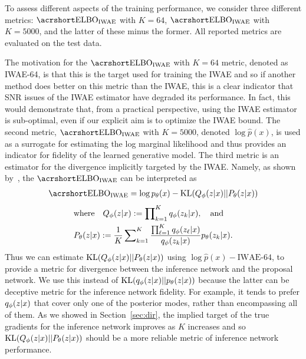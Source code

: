 To assess different aspects of the training performance, we consider three
different metrics: $\ELBO_{\text{IWAE}}$ with $K=64$, 
$\ELBO_{\text{IWAE}}$ with $K=5000$, and the latter of these minus
 the former.  All reported metrics are evaluated on the test data.

The motivation for the  $\ELBO_{\text{IWAE}}$ with $K=64$ metric,
denoted as \gls{IWAE}-64, is that this is the target
used for training the \gls{IWAE} and so if another method does better on
this metric than the \gls{IWAE}, this is a clear indicator that \gls{SNR} issues
of the \gls{IWAE} estimator have degraded its performance.   In fact, 
this would demonstrate that, from a practical perspective, 
using the \gls{IWAE} estimator is sub-optimal, even if our explicit aim is to
optimize the \gls{IWAE} bound.  
The second metric, $\ELBO_{\text{IWAE}}$ with $K=5000$, denoted $\log \hat{p}(x)$, is used as a surrogate
for estimating the log marginal likelihood and thus provides an indicator
for fidelity of the learned generative model.  
The third metric is an
estimator for the divergence implicitly targeted by the \gls{IWAE}.  Namely, as shown
by~\citet{le2017auto}, the $\ELBO_{\text{IWAE}}$ can be interpreted as
\begin{align}
\ELBO_{\text{IWAE}} = 
\log p_{\theta}(x) - \mathrm{KL}(Q_{\phi}(z \given x) || P_{\theta}(z \given x))
\end{align}
\begin{align}
&\text{where} \quad Q_{\phi}(z \lvert x) := \prod\nolimits_{k = 1}^K q_{\phi}(z_k \lvert x),
\quad \text{and} \\
&P_{\theta}(z \lvert x) := \frac{1}{K} \sum\nolimits_{k = 1}^K \frac{\prod_{\ell = 1}^K q_{\phi}(z_{\ell} \lvert x)}{q_{\phi}(z_k \lvert x)} p_{\theta}(z_k\lvert x).
\end{align}
Thus we can estimate $\mathrm{KL}(Q_{\phi}(z \lvert x) || P_{\theta}(z \lvert x))$
using $\log \hat{p}(x)-{\text{IWAE-64}}$, to provide a
metric for divergence between the inference network and the
 proposal network.  
We use this instead of
$\mathrm{KL}(q_{\phi}(z \lvert x) || p_{\theta}(z \lvert x))$
because the latter can be deceptive metric for the inference network
fidelity.  For example, it tends to 
prefer $q_{\phi}(z \lvert x)$ that cover only one of the posterior modes, rather than
encompassing all of them.  As we showed in Section~\ref{sec:dir}, the implied target 
of the true gradients for the inference network improves as $K$ increases and so 
$\mathrm{KL}(Q_{\phi}(z \lvert x) || P_{\theta}(z \lvert x))$ should be a more reliable
metric of inference network performance.


